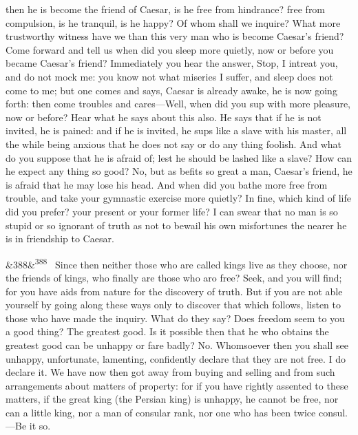 \documentclass[12pt]{article}
\newcommand{\para}[1][]{\par\noindent\ifx&#1&\else\textsuperscript{\footnotesize #1}~\fi}
\begin{document}
then he is become the friend of Caesar, is he free from hindrance? free from compulsion, is he tranquil, is he happy? Of whom shall we inquire? What more trustworthy witness have we than this very man who is become Caesar's friend? Come forward and tell us when did you sleep more quietly, now or before you became Caesar's friend? Immediately you hear the answer, Stop, I intreat you, and do not mock me: you know not what miseries I suffer, and sleep does not come to me; but one comes and says, Caesar is already awake, he is now going forth: then come troubles and cares—Well, when did you sup with more pleasure, now or before? Hear what he says about this also. He says that if he is not invited, he is pained: and if he is invited, he sups like a slave with his master, all the while being anxious that he does not say or do any thing foolish. And what do you suppose that he is afraid of; lest he should be lashed like a slave? How can he expect any thing so good? No, but as befits so great a man, Caesar's friend, he is afraid that he may lose his head. And when did you bathe more free from trouble, and take your gymnastic exercise more quietly? In fine, which kind of life did you prefer? your present or your former life? I can swear that no man is so stupid or so ignorant of truth as not to bewail his own misfortunes the nearer he is in friendship to Caesar.

\para[388] Since then neither those who are called kings live as they choose, nor the friends of kings, who finally are those who aro free? Seek, and you will find; for you have aids from nature for the discovery of truth. But if you are not able yourself by going along these ways only to discover that which follows, listen to those who have made the inquiry. What do they say? Does freedom seem to you a good thing? The greatest good. Is it possible then that he who obtains the greatest good can be unhappy or fare badly? No. Whomsoever then you shall see unhappy, unfortunate, lamenting, confidently declare that they are not free. I do declare it. We have now then got away from buying and selling and from such arrangements about matters of property: for if you have rightly assented to these matters, if the great king (the Persian king) is unhappy, he cannot be free, nor can a little king, nor a man of consular rank, nor one who has been twice consul.—Be it so.
\end{document}
